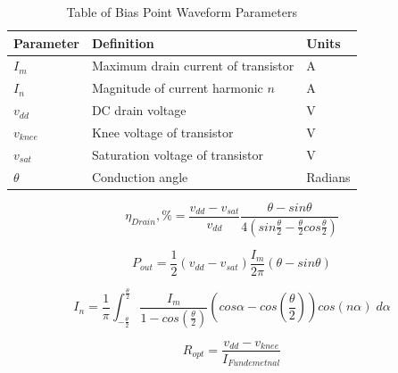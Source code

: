 
\begin{table}
    \caption{Table of Bias Point Waveform Parameters}
    \label{table:waveform_param}
        \begin{center}
            \begin{tabular}{|l|l|l|}
              \hline
              Parameter & Definition & Units\\ \hline
              $I_m$ & Maximum drain current of transistor & A \\ \hline
              $I_n$ & Magnitude of current harmonic $n$ & A \\ \hline
              $v_{dd}$ & DC drain voltage & V\\ \hline
              $v_{knee}$ & Knee voltage of transistor & V\\ \hline
              $v_{sat}$ & Saturation voltage of transistor & V \\ \hline
              $\theta$ & Conduction angle & Radians\\ \hline
              
            \end{tabular}
        \end{center}
\end{table}


\begin{equation}\label{eq:cond_eff}
  \eta_{Drain}, \% = \frac{v_{dd} - v_{sat}}{v_{dd}} \frac{\theta - sin\theta}{4(sin\frac{\theta}{2} - \frac{\theta}{2} cos\frac{\theta}{2}) }
\end{equation}

\begin{equation}\label{eq:cond_pout}
  P_{out} = \frac{1}{2}(v_{dd} - v_{sat} )\frac{I_m}{2\pi}(\theta - sin\theta)
\end{equation}

\begin{equation}\label{eq:cond_current}
  I_n = \frac{1}{\pi}\int_{-\frac{\theta}{2}}^{\frac{\theta}{2}} \frac{I_m}{1 - cos(\frac{\theta}{2})} (cos\alpha - cos(\frac{\theta}{2}))cos(n\alpha) \; d\alpha
\end{equation}

\begin{equation}\label{eq:opt_load}
  R_{opt} = \frac{v_{dd}-v_{knee}}{I_{Fundemetnal}}
\end{equation}

